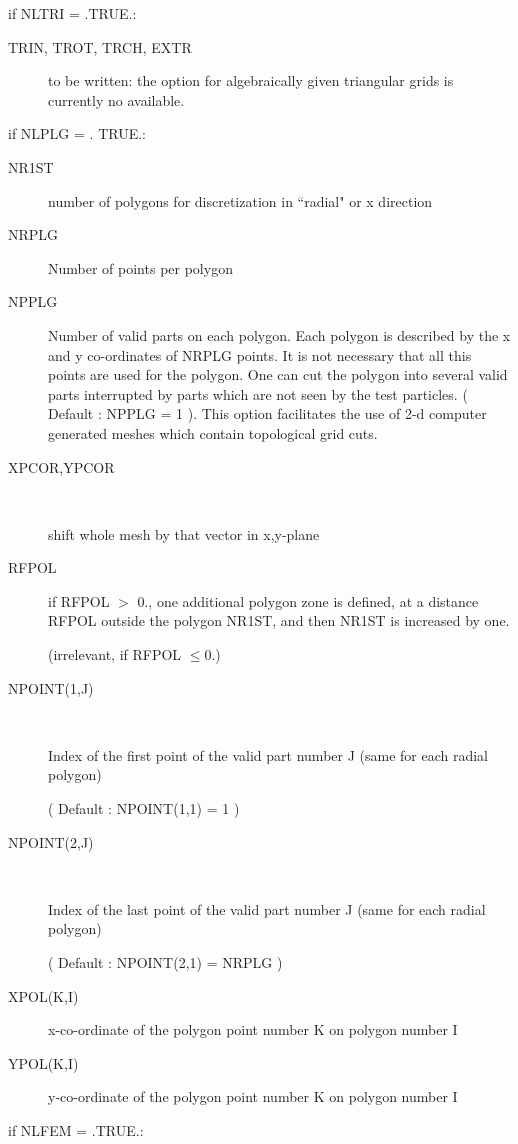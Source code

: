 if NLTRI = .TRUE.:
\begin{description}
  \item[TRIN, TROT, TRCH, EXTR] to be written: the option for algebraically given
        triangular grids is currently no available.

\end{description}
if NLPLG = .
TRUE.:
\begin{description}
  \item[NR1ST] number of polygons for discretization in ``radial" or x direction
  \item[NRPLG] Number of points per polygon
  \item[NPPLG] Number of valid parts on
        each polygon.
        Each polygon is described by the x and y co-ordinates of NRPLG points.
        It is not necessary that all this points are used for the polygon.
        One can cut the polygon into several valid parts interrupted by parts which are
        not seen by the test particles.
        ( Default :
        NPPLG = 1 ).
        This option facilitates the use of 2-d computer generated meshes which contain
        topological grid cuts.
  \item[XPCOR,YPCOR] ~ 

        shift whole mesh by that vector in x,y-plane
  \item[RFPOL] if RFPOL $>$ 0., one
        additional polygon zone is defined, at a distance RFPOL outside the polygon
        NR1ST, and then NR1ST is increased by one.

        (irrelevant, if RFPOL $\le 0$.)
  \item[NPOINT(1,J)] ~ 

        Index of the first point of the valid part number J (same for each radial
        polygon) 

        ( Default : NPOINT(1,1) = 1 )
  \item[NPOINT(2,J)] ~ 

        Index of the last point of the valid part number J (same for each radial
        polygon) 

        ( Default : NPOINT(2,1) = NRPLG )
  \item[XPOL(K,I)] x-co-ordinate of the polygon
        point number K on polygon number I
  \item[YPOL(K,I)] y-co-ordinate of the
        polygon point number K on polygon number I
\end{description}
if NLFEM = .TRUE.:
